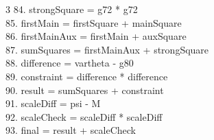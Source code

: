 \documentclass[10pt]{article}
\begin{document}
\begin{multicols}{3}
84. strongSquare = g72 * g72\\
85. firstMain = firstSquare + mainSquare\\
86. firstMainAux = firstMain + auxSquare\\
87. sumSquares = firstMainAux + strongSquare\\
88. difference = vartheta - g80\\
89. constraint = difference * difference\\
90. result = sumSquares + constraint\\
91. scaleDiff = psi - M\\
92. scaleCheck = scaleDiff * scaleDiff\\
93. final = result + scaleCheck\\
\end{multicols}
\end{document}
